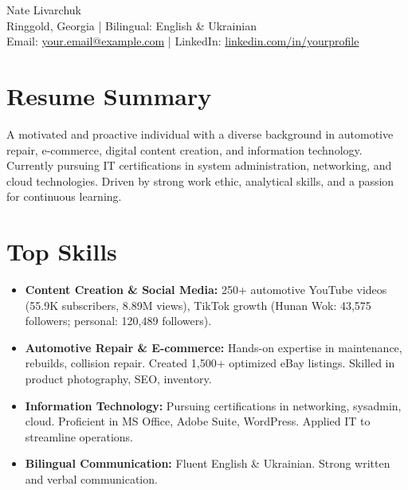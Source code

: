 \documentclass[a4paper,11pt]{article}
\begin{document}
\begin{center}
    {\Huge Nate Livarchuk}\\[6pt]
    Ringgold, Georgia \quad | \quad Bilingual: English \& Ukrainian\\
    Email: \href{mailto:your.email@example.com}{your.email@example.com} \quad | \quad LinkedIn: \href{https://linkedin.com/in/yourprofile}{linkedin.com/in/yourprofile}
\end{center}

\vspace{1em}

\section*{Resume Summary}
A motivated and proactive individual with a diverse background in automotive repair, e-commerce, digital content creation, and information technology. Currently pursuing IT certifications in system administration, networking, and cloud technologies. Driven by strong work ethic, analytical skills, and a passion for continuous learning.

\section*{Top Skills}
\begin{itemize}[leftmargin=*]
  \item \textbf{Content Creation \& Social Media:} 250+ automotive YouTube videos (55.9K subscribers, 8.89M views), TikTok growth (Hunan Wok: 43,575 followers; personal: 120,489 followers).
  \item \textbf{Automotive Repair \& E-commerce:} Hands-on expertise in maintenance, rebuilds, collision repair. Created 1,500+ optimized eBay listings. Skilled in product photography, SEO, inventory.
  \item \textbf{Information Technology:} Pursuing certifications in networking, sysadmin, cloud. Proficient in MS Office, Adobe Suite, WordPress. Applied IT to streamline operations.
  \item \textbf{Bilingual Communication:} Fluent English \& Ukrainian. Strong written and verbal communication.
\end{itemize}
\end{document}
